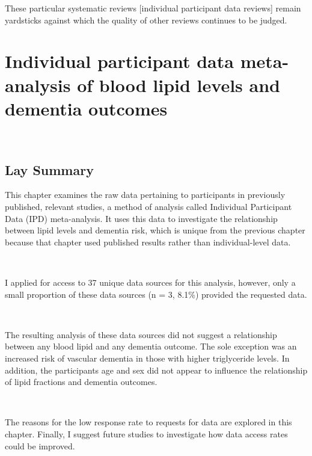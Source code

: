\documentclass[a4paper, twoside]{templates/ociamthesis}
\begin{document}
\begin{savequote}
These particular systematic reviews {[}individual participant data
reviews{]} remain yardsticks against which the quality of other reviews
continues to be judged.
\end{savequote}



\hypertarget{ipd-heading}{%
\chapter{Individual participant data meta-analysis of blood lipid levels and dementia outcomes}\label{ipd-heading}}

~

\minitoc 

\begin{laybox}

\hypertarget{lay-summary-5}{%
\section*{Lay Summary}\label{lay-summary-5}}

This chapter examines the raw data pertaining to participants in previously published, relevant studies, a method of analysis called Individual Participant Data (IPD) meta-analysis. It uses this data to investigate the relationship between lipid levels and dementia risk, which is unique from the previous chapter because that chapter used published results rather than individual-level data.

~

I applied for access to 37 unique data sources for this analysis, however, only a small proportion of these data sources (n = 3, 8.1\%) provided the requested data.

~

The resulting analysis of these data sources did not suggest a relationship between any blood lipid and any dementia outcome. The sole exception was an increased risk of vascular dementia in those with higher triglyceride levels. In addition, the participants age and sex did not appear to influence the relationship of lipid fractions and dementia outcomes.

~

The reasons for the low response rate to requests for data are explored in this chapter. Finally, I suggest future studies to investigate how data access rates could be improved.

\end{laybox}
\end{document}
